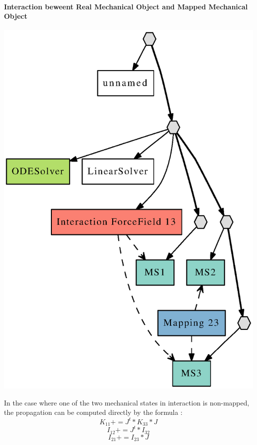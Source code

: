 \documentclass[a4paper,10pt]{article}
\begin{document}
\paragraph{Interaction beweent Real Mechanical Object and Mapped Mechanical Object}
\begin{center}
  \includegraphics[scale=0.3]{interaction_Real_Mapped}
\end{center}
In the case where one of the two mechanical states in interaction is non-mapped, the propagation can be computed directly by the formula :
\[
K_{11} += J^t * K_{33} * J 
\]
\[
I_{12} += J^t * I_{32}
\]
\[
I_{21} += I_{23} * J 
\]
\end{document}
